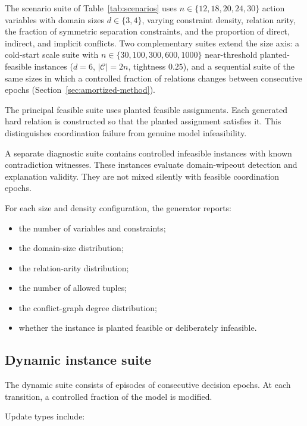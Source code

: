 \documentclass[pdflatex,sn-mathphys-num,iicol,oneside]{sn-jnl}
\begin{document}
The scenario suite of Table~\ref{tab:scenarios} uses
$n\in\{12,18,20,24,30\}$ action variables with domain sizes
$d\in\{3,4\}$, varying constraint density, relation arity, the fraction
of symmetric separation constraints, and the proportion of direct,
indirect, and implicit conflicts. Two complementary suites extend the
size axis: a cold-start scale suite with
$n\in\{30,100,300,600,1000\}$ near-threshold planted-feasible
instances ($d=6$, $|\mathcal{C}|=2n$, tightness $0.25$), and a
sequential suite of the same sizes in which a controlled fraction of
relations changes between consecutive epochs
(Section~\ref{sec:amortized-method}).

The principal feasible suite uses planted feasible assignments. Each
generated hard relation is constructed so that the planted assignment
satisfies it. This distinguishes coordination failure from genuine
model infeasibility.

A separate diagnostic suite contains controlled infeasible instances
with known contradiction witnesses. These instances evaluate
domain-wipeout detection and explanation validity. They are not mixed
silently with feasible coordination epochs.

For each size and density configuration, the generator reports:

\begin{itemize}
    \item the number of variables and constraints;
    \item the domain-size distribution;
    \item the relation-arity distribution;
    \item the number of allowed tuples;
    \item the conflict-graph degree distribution;
    \item whether the instance is planted feasible or deliberately
    infeasible.
\end{itemize}

\subsection{Dynamic instance suite}

The dynamic suite consists of episodes of consecutive decision
epochs. At each transition, a controlled fraction of the model is
modified.

Update types include:
\end{document}
